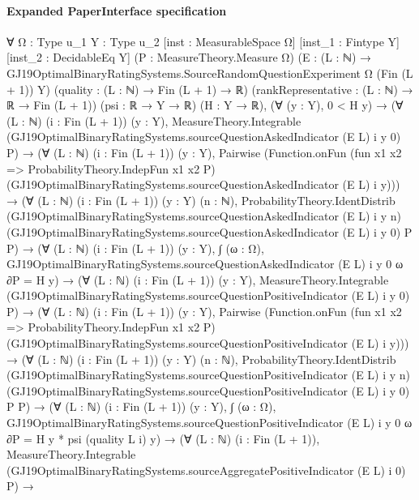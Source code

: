\documentclass[10pt]{article}
\begin{document}
\paragraph{Expanded PaperInterface specification}
\begin{ReviewVerbatim}
∀ {Ω : Type u_1} {Y : Type u_2} [inst : MeasurableSpace Ω] [inst_1 : Fintype Y] [inst_2 : DecidableEq Y]
  (P : MeasureTheory.Measure Ω)
  (E : (L : ℕ) → GJ19OptimalBinaryRatingSystems.SourceRandomQuestionExperiment Ω (Fin (L + 1)) Y)
  (quality : (L : ℕ) → Fin (L + 1) → ℝ) (rankRepresentative : (L : ℕ) → ℝ → Fin (L + 1)) (psi : ℝ → Y → ℝ) (H : Y → ℝ),
  (∀ (y : Y), 0 < H y) →
    (∀ (L : ℕ) (i : Fin (L + 1)) (y : Y),
        MeasureTheory.Integrable (GJ19OptimalBinaryRatingSystems.sourceQuestionAskedIndicator (E L) i y 0) P) →
      (∀ (L : ℕ) (i : Fin (L + 1)) (y : Y),
          Pairwise
            (Function.onFun (fun x1 x2 => ProbabilityTheory.IndepFun x1 x2 P)
              (GJ19OptimalBinaryRatingSystems.sourceQuestionAskedIndicator (E L) i y))) →
        (∀ (L : ℕ) (i : Fin (L + 1)) (y : Y) (n : ℕ),
            ProbabilityTheory.IdentDistrib (GJ19OptimalBinaryRatingSystems.sourceQuestionAskedIndicator (E L) i y n)
              (GJ19OptimalBinaryRatingSystems.sourceQuestionAskedIndicator (E L) i y 0) P P) →
          (∀ (L : ℕ) (i : Fin (L + 1)) (y : Y),
              ∫ (ω : Ω), GJ19OptimalBinaryRatingSystems.sourceQuestionAskedIndicator (E L) i y 0 ω ∂P = H y) →
            (∀ (L : ℕ) (i : Fin (L + 1)) (y : Y),
                MeasureTheory.Integrable (GJ19OptimalBinaryRatingSystems.sourceQuestionPositiveIndicator (E L) i y 0)
                  P) →
              (∀ (L : ℕ) (i : Fin (L + 1)) (y : Y),
                  Pairwise
                    (Function.onFun (fun x1 x2 => ProbabilityTheory.IndepFun x1 x2 P)
                      (GJ19OptimalBinaryRatingSystems.sourceQuestionPositiveIndicator (E L) i y))) →
                (∀ (L : ℕ) (i : Fin (L + 1)) (y : Y) (n : ℕ),
                    ProbabilityTheory.IdentDistrib
                      (GJ19OptimalBinaryRatingSystems.sourceQuestionPositiveIndicator (E L) i y n)
                      (GJ19OptimalBinaryRatingSystems.sourceQuestionPositiveIndicator (E L) i y 0) P P) →
                  (∀ (L : ℕ) (i : Fin (L + 1)) (y : Y),
                      ∫ (ω : Ω), GJ19OptimalBinaryRatingSystems.sourceQuestionPositiveIndicator (E L) i y 0 ω ∂P =
                        H y * psi (quality L i) y) →
                    (∀ (L : ℕ) (i : Fin (L + 1)),
                        MeasureTheory.Integrable
                          (GJ19OptimalBinaryRatingSystems.sourceAggregatePositiveIndicator (E L) i 0) P) →

\end{ReviewVerbatim}
\end{document}
